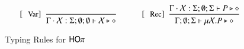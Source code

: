 \begin{figure}[!t]
\[\begin{array}{c}
		\trule{Var}~~\tree{
	
		}{
			\Gamma \cat \rvar{X}: \Sigma; \emptyset; \emptyset  \proves \rvar{X} \hastype \Proc
		}
		\qquad\quad 

	 	\trule{Rec}~~\tree{
			\Gamma \cat \rvar{X}: \Sigma; \emptyset; \Sigma  \proves P \hastype \Proc
		}{
			\Gamma ; \emptyset; \Sigma  \proves \recp{X}{P} \hastype \Proc
		}


	\end{array}
\]
\caption{Typing Rules for $\mathsf{HO}\pi$\label{fig:typerulesmy}}
\end{figure}